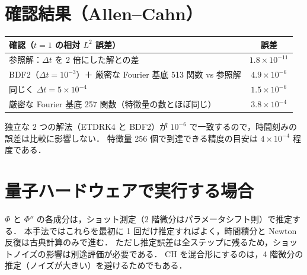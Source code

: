 \documentclass[uplatex,dvipdfmx,a4paper,11pt]{jsarticle}
\begin{document}
\section{確認結果（Allen--Cahn）}
\begin{table}[h]
\centering
\begin{tabular}{lc}
\toprule
確認（$t=1$ の相対 $L^2$ 誤差） & 誤差\\
\midrule
参照解：$\Delta t$ を 2 倍にした解との差 & $1.8\times10^{-11}$\\
BDF2（$\Delta t=10^{-3}$）＋ 厳密な Fourier 基底 513 関数 vs 参照解 & $4.9\times10^{-6}$\\
同じく $\Delta t=5\times10^{-4}$ & $1.5\times10^{-6}$\\
厳密な Fourier 基底 257 関数（特徴量の数とほぼ同じ） & $3.8\times10^{-4}$\\
\bottomrule
\end{tabular}
\end{table}
独立な 2 つの解法（ETDRK4 と BDF2）が $10^{-6}$ で一致するので，時間刻みの誤差は比較に影響しない．
特徴量 256 個で到達できる精度の目安は $4\times10^{-4}$ 程度である．

\section{量子ハードウェアで実行する場合}
$\Phi$ と $\Phi''$ の各成分は，ショット測定（2 階微分はパラメータシフト則）で推定する．
本手法ではこれらを最初に 1 回だけ推定すればよく，時間積分と Newton 反復は古典計算のみで進む．
ただし推定誤差は全ステップに残るため，ショットノイズの影響は別途評価が必要である．
CH を混合形にするのは，4 階微分の推定（ノイズが大きい）を避けるためでもある．
\end{document}
